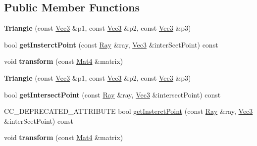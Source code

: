 \subsection*{Public Member Functions}
\begin{DoxyCompactItemize}
\item 
\mbox{\label{structTerrain_1_1Triangle_a958b71814d21025e7da2dd6cb41809a7}} 
{\bfseries Triangle} (const \hyperlink{classVec3}{Vec3} \&p1, const \hyperlink{classVec3}{Vec3} \&p2, const \hyperlink{classVec3}{Vec3} \&p3)
\item 
\mbox{\label{structTerrain_1_1Triangle_a71f61d4fbf90ec58239042cfa2fe2851}} 
bool {\bfseries get\+Insterct\+Point} (const \hyperlink{classRay}{Ray} \&ray, \hyperlink{classVec3}{Vec3} \&inter\+Scet\+Point) const
\item 
\mbox{\label{structTerrain_1_1Triangle_a4712711b2745f97cf1672caa406ab37e}} 
void {\bfseries transform} (const \hyperlink{classMat4}{Mat4} \&matrix)
\item 
\mbox{\label{structTerrain_1_1Triangle_a958b71814d21025e7da2dd6cb41809a7}} 
{\bfseries Triangle} (const \hyperlink{classVec3}{Vec3} \&p1, const \hyperlink{classVec3}{Vec3} \&p2, const \hyperlink{classVec3}{Vec3} \&p3)
\item 
\mbox{\label{structTerrain_1_1Triangle_a9f413645f2b3bd1a4b89d27c55726947}} 
bool {\bfseries get\+Intersect\+Point} (const \hyperlink{classRay}{Ray} \&ray, \hyperlink{classVec3}{Vec3} \&intersect\+Point) const
\item 
C\+C\+\_\+\+D\+E\+P\+R\+E\+C\+A\+T\+E\+D\+\_\+\+A\+T\+T\+R\+I\+B\+U\+TE bool \hyperlink{structTerrain_1_1Triangle_a9b2fcc5f46f1ee2cb5d59f4f562c4e30}{get\+Insterct\+Point} (const \hyperlink{classRay}{Ray} \&ray, \hyperlink{classVec3}{Vec3} \&inter\+Scet\+Point) const
\item 
\mbox{\label{structTerrain_1_1Triangle_a4712711b2745f97cf1672caa406ab37e}} 
void {\bfseries transform} (const \hyperlink{classMat4}{Mat4} \&matrix)
\end{DoxyCompactItemize}
